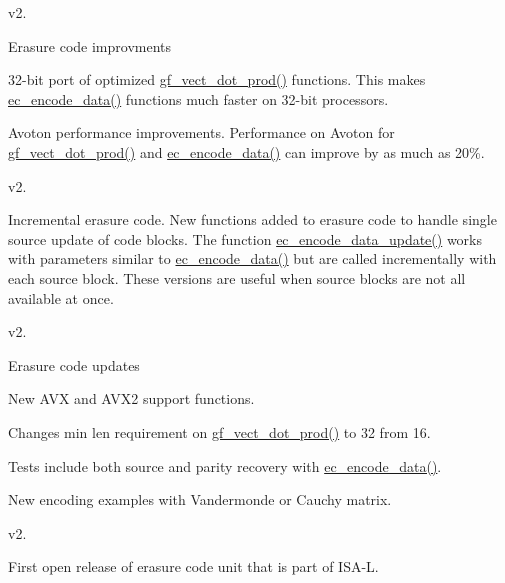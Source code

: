 v2.


\begin{DoxyItemize}
\item Erasure code improvments
\begin{DoxyItemize}
\item 32-\/bit port of optimized \hyperlink{erasure__code_8h_a6ce05684e168d73773847a3c2c13c175}{gf\-\_\-vect\-\_\-dot\-\_\-prod()} functions. This makes \hyperlink{erasure__code_8h_a590b5c35075aeea1243a9e4ef73a49d4}{ec\-\_\-encode\-\_\-data()} functions much faster on 32-\/bit processors.
\item Avoton performance improvements. Performance on Avoton for \hyperlink{erasure__code_8h_a6ce05684e168d73773847a3c2c13c175}{gf\-\_\-vect\-\_\-dot\-\_\-prod()} and \hyperlink{erasure__code_8h_a590b5c35075aeea1243a9e4ef73a49d4}{ec\-\_\-encode\-\_\-data()} can improve by as much as 20\%.
\end{DoxyItemize}
\end{DoxyItemize}

v2.


\begin{DoxyItemize}
\item Incremental erasure code. New functions added to erasure code to handle single source update of code blocks. The function \hyperlink{erasure__code_8h_a0fa4553065d7e00c1984621e7e1af9ae}{ec\-\_\-encode\-\_\-data\-\_\-update()} works with parameters similar to \hyperlink{erasure__code_8h_a590b5c35075aeea1243a9e4ef73a49d4}{ec\-\_\-encode\-\_\-data()} but are called incrementally with each source block. These versions are useful when source blocks are not all available at once.
\end{DoxyItemize}

v2.


\begin{DoxyItemize}
\item Erasure code updates
\begin{DoxyItemize}
\item New A\-V\-X and A\-V\-X2 support functions.
\item Changes min len requirement on \hyperlink{erasure__code_8h_a6ce05684e168d73773847a3c2c13c175}{gf\-\_\-vect\-\_\-dot\-\_\-prod()} to 32 from 16.
\item Tests include both source and parity recovery with \hyperlink{erasure__code_8h_a590b5c35075aeea1243a9e4ef73a49d4}{ec\-\_\-encode\-\_\-data()}.
\item New encoding examples with Vandermonde or Cauchy matrix.
\end{DoxyItemize}
\end{DoxyItemize}

v2.


\begin{DoxyItemize}
\item First open release of erasure code unit that is part of I\-S\-A-\/\-L. 
\end{DoxyItemize}